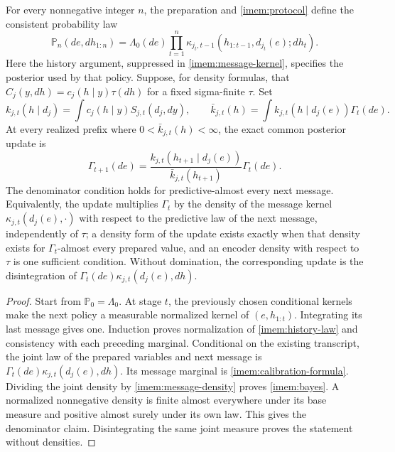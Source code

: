 For every nonnegative integer $n$, the preparation and \cref{imem:protocol} define the consistent probability law
\begin{equation}
 \mathbb P_n(de,dh_{1:n})
 =\Lambda_0(de)\prod_{t=1}^n
 \kappa_{j_t,t-1}(h_{1:t-1},d_{j_t}(e);dh_t).
 \label{imem:history-law}
\end{equation}
Here the history argument, suppressed in \cref{imem:message-kernel}, specifies the posterior used by that policy. Suppose, for density formulas, that $C_j(y,dh)=c_j(h\mid y)\tau(dh)$ for a fixed sigma-finite $\tau$. Set
\begin{equation}
 k_{j,t}(h\mid d_j)=\int c_j(h\mid y)S_{j,t}(d_j,dy),\qquad
 \bar k_{j,t}(h)=\int k_{j,t}(h\mid d_j(e))\Gamma_t(de).
 \label{imem:message-density}
\end{equation}
At every realized prefix where $0<\bar k_{j,t}(h)<\infty$, the exact common posterior update is
\begin{equation}
 \Gamma_{t+1}(de)
 =\frac{k_{j,t}(h_{t+1}\mid d_j(e))}{\bar k_{j,t}(h_{t+1})}\Gamma_t(de).
 \label{imem:bayes}
\end{equation}
The denominator condition holds for predictive-almost every next message. Equivalently, the update multiplies $\Gamma_t$ by the density of the message kernel $\kappa_{j,t}(d_j(e),\cdot)$ with respect to the predictive law of the next message, independently of $\tau$; a density form of the update exists exactly when that density exists for $\Gamma_t$-almost every prepared value, and an encoder density with respect to $\tau$ is one sufficient condition. Without domination, the corresponding update is the disintegration of $\Gamma_t(de)\kappa_{j,t}(d_j(e),dh)$.
\begin{proof}
Start from $\mathbb P_0=\Lambda_0$. At stage $t$, the previously chosen conditional kernels make the next policy a measurable normalized kernel of $(e,h_{1:t})$. Integrating its last message gives one. Induction proves normalization of \cref{imem:history-law} and consistency with each preceding marginal. Conditional on the existing transcript, the joint law of the prepared variables and next message is $\Gamma_t(de)\kappa_{j,t}(d_j(e),dh)$. Its message marginal is \cref{imem:calibration-formula}. Dividing the joint density by \cref{imem:message-density} proves \cref{imem:bayes}. A normalized nonnegative density is finite almost everywhere under its base measure and positive almost surely under its own law. This gives the denominator claim. Disintegrating the same joint measure proves the statement without densities.
\end{proof}

